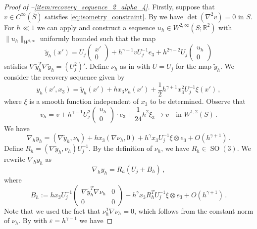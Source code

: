 \documentclass{article}
\theoremstyle{plain}
\theoremstyle{plain}
\theoremstyle{plain}
\theoremstyle{plain}
\theoremstyle{plain}
\theoremstyle{definition}
\theoremstyle{definition}
\renewcommand{\r}{\mathbb{R}}
\DeclareMathOperator{\SO}{SO}
\begin{document}
\begin{proof}[Proof of --\ref{item:recovery_sequence_2_alpha_4}]
    Firstly, suppose that $v \in C^{\infty}(\bar S)$ satisfies \eqref{eq:isometry_constraint}. By  we have $\det(\nabla^2 v) = 0$ in $S$. For $h \ll 1$ we can apply  and construct a sequence $u_h \in W^{2, \infty}(S; \r^2)$ with $\|u_h\|_{W^{2, \infty}}$ uniformly bounded such that the map
    \[
        \tilde y_h (x') = U_j \begin{pmatrix}
            x' \\ 0
        \end{pmatrix} + h^{\gamma - 1}vU^{-1}_je_3 + h^{2\gamma - 2}U_j\begin{pmatrix}
            u_h \\ 0
        \end{pmatrix}
    \]
    satisfies $\nabla \tilde y^T_h \nabla \tilde y_h = (U^2_j)'$. Define $\nu_h$ as in  with $U = U_j$ for the map $\tilde y_h$. We consider the recovery sequence given by
    \[
        y_h(x', x_3) = \tilde y_h(x') + hx_3 \nu_h(x') +\dfrac{1}{2} h^{\gamma + 1} x_3^2 U_j^{-1} \xi(x') \,,
    \]
    where $\xi$ is a smooth function independent of $x_3$ to be determined. Observe that
    \[
    	v_h = v +h^{\gamma - 1} U_j^2 \begin{pmatrix}
    	u_h \\ 0
    	\end{pmatrix} \cdot e_3 + \dfrac{1}{24}h^2 \xi_3 \to v \quad \text{in} \, \, W^{1, 2}(S) \,.    
    \]
    We have
    \begin{equation}\label{eq:rescaled_gradient_recovery_sequence_24}
        \nabla_h y_h =(\nabla \tilde y_h, \nu_h) + h x_3(\nabla \nu_h, 0) + h^{\gamma} x_3 U_j^{-1} \xi \otimes e_3 + O(h^{\gamma + 1}) \,.
    \end{equation}
    Define $R_h = (\nabla \tilde y_h, \nu_h) U_j^{-1}$. By the definition of $\nu_h$, we have $R_h \in \SO(3)$. We rewrite $\nabla_h y_h$ as
    \[
        \nabla_h y_h = R_h(U_j + B_h) \,,
    \]
    where
    \[
        B_h := hx_3 U_j^{-1}\begin{pmatrix}
            \nabla \tilde y_h^T  \nabla \nu_h & 0 \\
            0 & 0
        \end{pmatrix} + h^{\gamma} x_3 R_h^T U_j^{-1} \xi \otimes e_3 + O(h^{\gamma + 1}) \,.
    \]
    Note that we used the fact that $\nu_h^T \nabla \nu_h = 0$, which follows from the constant norm of $\nu_h$. By  with $\varepsilon = h^{\gamma - 1}$ we have

\end{proof}
\end{document}
